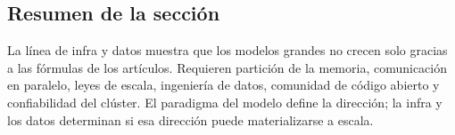 \subsection{Resumen de la sección}

La línea de infra y datos muestra que los modelos grandes no crecen solo gracias a las fórmulas de los artículos. Requieren partición de la memoria, comunicación en paralelo, leyes de escala, ingeniería de datos, comunidad de código abierto y confiabilidad del clúster. El paradigma del modelo define la dirección; la infra y los datos determinan si esa dirección puede materializarse a escala.
